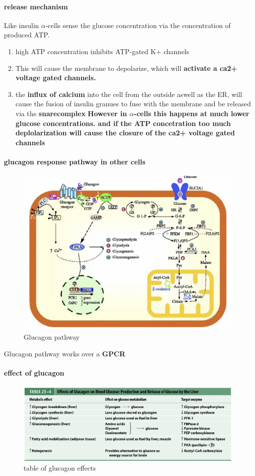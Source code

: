 \documentclass[../main.tex]{subfiles}
\begin{document}
\paragraph{release mechanism}
Like insulin $\alpha$-cells sense the glucose concentration via the concentration of produced ATP.
\begin{enumerate}
    \item high ATP concentration inhibits ATP-gated K+ channels
    \item This will cause the membrane to depolarize, which will\textbf{ activate a ca2+ voltage gated channels. }
    \item the \textbf{influx of calcium} into the cell from the outside aswell as the ER, will cause the fusion of insulin granues to fuse with the membrane and be released via the \textbf{\gls{snarecomplex}} \textbf{However in $\alpha$-cells this happens at much lower glucose concentrations. and if the ATP concetration too much deplolarization will cause the closure of the ca2+ voltage gated channels}
\end{enumerate}
\paragraph{glucagon response pathway in other cells}
\begin{figure}[H]
    \centering
    \includegraphics[width=0.5\linewidth]{GlucagonPathway.png}
    \caption{Glucagon pathway}
    \label{fig:enter-label}
\end{figure}
Glucagon pathway works over a \textbf{GPCR}

\paragraph{effect of glucagon}
\begin{figure}[H]
    \centering
    \includegraphics[width=1\linewidth]{glucagonTable.png}
    \caption{table of glucagon effects}
    \label{fig:enter-label}
\end{figure}
\end{document}
